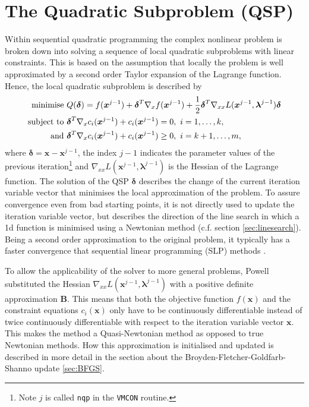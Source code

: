 \documentclass[11pt,a4paper]{report}
\newcommand{\mat}[1]{\mathbf{#1}}
\newcommand{\vmcon}{\mbox{\texttt{VMCON}}}
\renewcommand{\vec}[1]{\boldsymbol{#1}}
\begin{document}
\section{The Quadratic Subproblem (QSP)}
\label{sec:QSP}
Within sequential quadratic programming the complex nonlinear problem is
broken down into solving a sequence of local quadratic subproblems with linear
constraints. This is based on the assumption that locally the problem is well
approximated by a second order Taylor expansion of the Lagrange
function. %
Hence, the local quadratic subproblem is described by
\begin{subequations}
\begin{align}
\textnormal{minimise } &Q(\vec{\delta}) = f(\vec{x}^{j-1}) + \vec{\delta}^T
\nabla_x f(\vec{x}^{j-1})+ \frac{1}{2} \vec{\delta}^T \nabla_{xx}
L(\vec{x}^{j-1},\vec{\lambda}^{j-1})\vec{\delta} \\
\textnormal{subject to } &\vec{\delta}^T \nabla_x c_i (\vec{x}^{j-1}) +
c_i(\vec{x}^{j-1}) = 0,\ i = 1,\dots,k,\\
\textnormal{and } &\vec{\delta}^T \nabla_x c_i (\vec{x}^{j-1}) +
c_i(\vec{x}^{j-1}) \geq 0,\ i = k+1,\dots,m,
\end{align}
\end{subequations}
where $\vec{\delta} = \vec{x} - \vec{x}^{j-1}$, the index $j-1$ indicates the
parameter values of the previous iteration\footnote{Note $j$ is called
  \texttt{nqp} in the \vmcon\/ routine.} and
$\nabla_{xx}L(\vec{x}^{j-1},\vec{\lambda}^{j-1})$ is the Hessian of the
Lagrange function. The solution of the QSP $\vec{\delta}$ describes the change
of the current iteration variable vector that minimises the local
approximation of the problem. To assure convergence even from bad starting
points, it is not directly used to update the iteration variable vector, but
describes the direction of the line search in which a 1d function is minimised
using a Newtonian method (c.f. section \ref{sec:linesearch}). Being a second
order approximation to the original problem, it typically has a faster
convergence that sequential linear programming (SLP) methods
\cite[chap. 10.4]{Bazaraa1993}.

To allow the applicability of the solver to more general problems, Powell
\cite{Powell1978} substituted the Hessian
$\nabla_{xx}L(\vec{x}^{j-1},\vec{\lambda}^{j-1})$ with a positive definite
approximation $\mat{B}$. This means that both the objective function
$f(\vec{x})$ and the constraint equations $c_i(\vec{x})$ only have to be
continuously differentiable instead of twice continuously differentiable with
respect to the iteration variable vector $\vec{x}$. This makes the method a
Quasi-Newtonian method as opposed to true Newtonian methods. How this
approximation is initialised and updated is described in more detail in the
section about the Broyden-Fletcher-Goldfarb-Shanno update \ref{sec:BFGS}.
\end{document}
